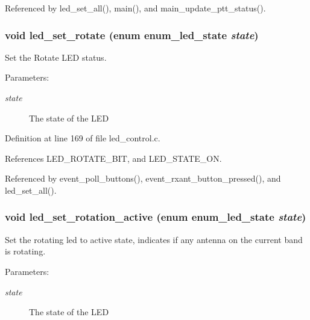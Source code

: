 Referenced by led\_\-set\_\-all(), main(), and main\_\-update\_\-ptt\_\-status().
\subsubsection[{led\_\-set\_\-rotate}]{\setlength{\rightskip}{0pt plus 5cm}void led\_\-set\_\-rotate (enum {\bf enum\_\-led\_\-state} {\em state})}\label{led__control_8c_c7b0014c475fe68f1db5ef137c71bb84}


Set the Rotate LED status. 

\begin{Desc}
\item[Parameters:]
\begin{description}
\item[{\em state}]The state of the LED \end{description}
\end{Desc}


Definition at line 169 of file led\_\-control.c.

References LED\_\-ROTATE\_\-BIT, and LED\_\-STATE\_\-ON.

Referenced by event\_\-poll\_\-buttons(), event\_\-rxant\_\-button\_\-pressed(), and led\_\-set\_\-all().
\subsubsection[{led\_\-set\_\-rotation\_\-active}]{\setlength{\rightskip}{0pt plus 5cm}void led\_\-set\_\-rotation\_\-active (enum {\bf enum\_\-led\_\-state} {\em state})}\label{led__control_8c_67a6ae6da6bd1e1000cb0cfae12ebf53}


Set the rotating led to active state, indicates if any antenna on the current band is rotating. 

\begin{Desc}
\item[Parameters:]
\begin{description}
\item[{\em state}]The state of the LED \end{description}
\end{Desc}


